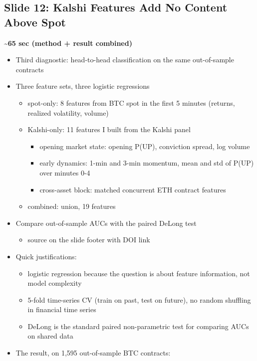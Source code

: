 \documentclass[
]{article}
\providecommand{\tightlist}{%
  \setlength{\itemsep}{0pt}\setlength{\parskip}{0pt}}
\begin{document}
\subsection{Slide 12: Kalshi Features Add No Content Above
Spot}\label{slide-12-kalshi-features-add-no-content-above-spot}

\textbf{\textasciitilde65 sec (method + result combined)}

\begin{itemize}
\tightlist
\item
  Third diagnostic: head-to-head classification on the same
  out-of-sample contracts
\item
  Three feature sets, three logistic regressions

  \begin{itemize}
  \tightlist
  \item
    spot-only: 8 features from BTC spot in the first 5 minutes (returns,
    realized volatility, volume)
  \item
    Kalshi-only: 11 features I built from the Kalshi panel

    \begin{itemize}
    \tightlist
    \item
      opening market state: opening P(UP), conviction spread, log volume
    \item
      early dynamics: 1-min and 3-min momentum, mean and std of P(UP)
      over minutes 0-4
    \item
      cross-asset block: matched concurrent ETH contract features
    \end{itemize}
  \item
    combined: union, 19 features
  \end{itemize}
\item
  Compare out-of-sample AUCs with the paired DeLong test

  \begin{itemize}
  \tightlist
  \item
    source on the slide footer with DOI link
  \end{itemize}
\item
  Quick justifications:

  \begin{itemize}
  \tightlist
  \item
    logistic regression because the question is about feature
    information, not model complexity
  \item
    5-fold time-series CV (train on past, test on future), no random
    shuffling in financial time series
  \item
    DeLong is the standard paired non-parametric test for comparing AUCs
    on shared data
  \end{itemize}
\item
  The result, on 1,595 out-of-sample BTC contracts:


\end{itemize}
\end{document}
